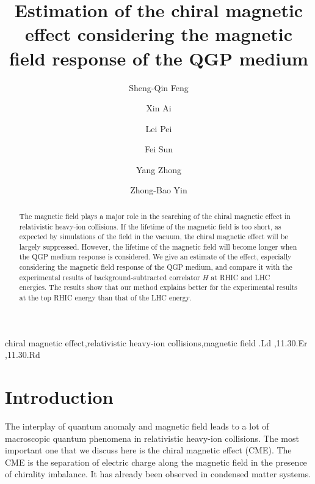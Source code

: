 \documentclass[preprint]{elsarticle}
\begin{document}
\begin{frontmatter}

\title{Estimation of the chiral magnetic effect considering the magnetic field response of the QGP medium}

\author[ctgu,moe,wuhan]{Sheng-Qin Feng}

\author[ctgu]{Xin Ai}

\author[ctgu]{Lei Pei}

\author[ctgu]{Fei Sun}

\author[ctgu]{Yang Zhong}

\author[moe]{Zhong-Bao Yin}

\address[ctgu]{College of Science, China Three Gorges University, Yichang 443002, China}
\address[moe]{Key Laboratory of Quark and Lepton Physics (MOE) and Institute of Particle Physics,\\
Central China Normal University, Wuhan 430079, China}
\address[wuhan]{School of Physics and Technology, Wuhan University, Wuhan 430072, China}

\begin{abstract}
The magnetic field plays a major role in the searching of the chiral magnetic effect in relativistic heavy-ion collisions. If the lifetime of the magnetic field is too short, as expected by simulations of the field in the vacuum, the chiral magnetic effect will be largely suppressed. However, the lifetime of the magnetic field will become longer when the QGP medium response is considered. We give an estimate of the effect, especially considering the magnetic field response of the QGP medium, and compare it with the experimental results of background-subtracted correlator $H$ at RHIC and LHC energies. The results show that our method explains better for the experimental results at the top  RHIC energy than that of the LHC energy.
\end{abstract}

\begin{keyword}
chiral magnetic effect\sep relativistic heavy-ion collisions\sep magnetic field
.Ld \sep 11.30.Er \sep 11.30.Rd
\end{keyword}

\end{frontmatter}


\section{Introduction}\label{intro}
The interplay of quantum anomaly and magnetic field leads to a lot of macroscopic quantum phenomena in relativistic heavy-ion collisions. The most important one that we discuss here is the chiral magnetic effect (CME). The CME is the separation of electric charge along the magnetic field in the presence of chirality imbalance\cite{Kharzeev:2007jp,Warringa:2008kv,Fukushima:2008xe}. It has already been observed in condensed matter systems\cite{Li:2014bha}.
\end{document}
